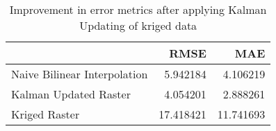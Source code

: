 \begin{table}
\caption{Improvement in error metrics after applying Kalman Updating of kriged data}
\label{tab:oahu2_gebco_raster_error}
\begin{tabular}{lrr}
\toprule
 & RMSE & MAE \\
\midrule
Naive Bilinear Interpolation & 5.942184 & 4.106219 \\
Kalman Updated Raster & 4.054201 & 2.888261 \\
Kriged Raster & 17.418421 & 11.741693 \\
\bottomrule
\end{tabular}
\end{table}
